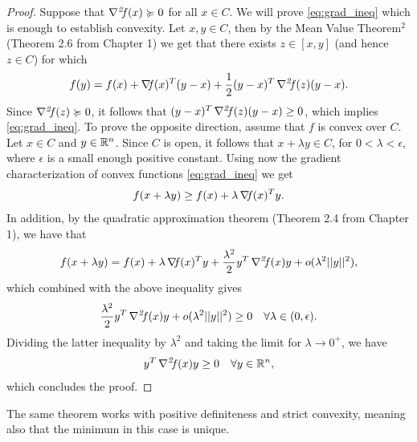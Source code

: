 \documentclass[10pt,a4paper]{article}
\begin{document}
\begin{proof}
	Suppose that $\operatorname*{\mathit{\nabla^2 \!f}}(x) \succcurlyeq 0$ for all $x \in C$. We will prove \eqref{eq:grad_ineq} which is enough to establish convexity. Let $x,y\in C$, then by the Mean Value Theorem$^2$ (Theorem 2.6 from Chapter 1) we get that there exists $z\in[x,y]$ (and hence $z\in C$) for which 
	\begin{equation}\label{eq:mvt2_app}
		f(y) = f(x)+ \operatorname*{\mathit{\nabla \!f}} (x)^T(y-x) +\frac{1}{2}(y-x)^T\operatorname*{\mathit{\nabla^2 \!f}}(z)(y-x).
	\end{equation}
Since $\operatorname*{\mathit{\nabla^2 \!f}}(z) \succcurlyeq 0$, it follows that $(y-x)^T\operatorname*{\mathit{\nabla^2 \!f}}(z)(y-x)\geq0$, which implies \eqref{eq:grad_ineq}.
To prove the opposite direction, assume that $f$ is convex over $C$. Let $x\in C$ and $y\in \mathbb{R}^n$. Since $C$ is open, it follows that $x+\lambda y \in C$, for $0<\lambda<\epsilon$, where $\epsilon$ is a small enough positive constant. Using now the gradient characterization of convex functions \eqref{eq:grad_ineq} we get 
\begin{equation*}
	f(x+\lambda y) \geq f(x) + \lambda\operatorname*{\mathit{\nabla \!f}}(x)^Ty.
\end{equation*}
In addition, by the quadratic approximation theorem (Theorem 2.4 from Chapter 1), we have that 
\begin{equation*}
	f(x+\lambda y) = f(x) + \lambda \operatorname*{\mathit{\nabla \!f}}(x)^Ty + \frac{\lambda^2}{2}y^T\operatorname*{\mathit{\nabla^2 \!f}}(x)y + o(\lambda^2||y||^2),
\end{equation*}
which combined with the above inequality gives 
\begin{equation*}
	\frac{\lambda^2}{2}y^T\operatorname*{\mathit{\nabla^2 \!f}}(x)y + o(\lambda^2||y||^2) \geq 0 \quad \forall \lambda\in (0,\epsilon).
\end{equation*}
Dividing the latter inequality by $\lambda^2$ and taking the limit for $\lambda\to 0^+$, we have 
\begin{equation*}
	y^T\operatorname*{\mathit{\nabla^2 \!f}}(x)y \geq 0 \quad \forall y \in \mathbb{R}^n,
\end{equation*}
which concludes the proof.
\end{proof}
The same theorem works with positive definiteness and strict convexity, meaning also that the minimum in this case is unique.
\end{document}
